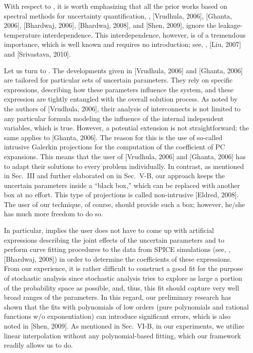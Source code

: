 \begin{authors}
With respect to , it is worth emphasizing that all the prior works based on spectral methods for uncertainty quantification, \ie, [Vrudhula, 2006], [Ghanta, 2006], [Bhardwaj, 2006], [Bhardwaj, 2008], and [Shen, 2009], ignore the leakage-temperature interdependence.
This interdependence, however, is of a tremendous importance, which is well known and requires no introduction; see, \eg, [Liu, 2007] and [Srivastava, 2010].

Let us turn to .
The developments given in [Vrudhula, 2006] and [Ghanta, 2006] are tailored for particular sets of uncertain parameters.
They rely on specific expressions, describing how these parameters influence the system, and these expression are tightly entangled with the overall solution process.
As noted by the authors of [Vrudhula, 2006], their analysis of interconnects is not limited to any particular formula modeling the influence of the internal independent variables, which is true.
However, a potential extension is not straightforward; the same applies to [Ghanta, 2006].
The reason for this is the use of so-called intrusive Galerkin projections for the computation of the coefficient of PC expansions.
This means that the user of [Vrudhula, 2006] and [Ghanta, 2006] has to adapt their solutions to every problem individually.
In contrast, as mentioned in Sec.~III and further elaborated on in Sec.~V-B, our approach keeps the uncertain parameters inside a ``black box,'' which can be replaced with another box at no effort.
This type of projections is called non-intrusive [Eldred, 2008].
The user of our technique, of course, should provide such a box; however, he/she has much more freedom to do so.

In particular,  implies the user does not have to come up with artificial expressions describing the joint effects of the uncertain parameters and to perform curve fitting procedures to the data from SPICE simulations (see, \eg, [Bhardwaj, 2008]) in order to determine the coefficients of these expressions.
From our experience, it is rather difficult to construct a good fit for the purpose of stochastic analysis since stochastic analysis tries to explore as large a portion of the probability space as possible, and, thus, this fit should capture very well broad ranges of the parameters.
In this regard, our preliminary research has shown that the fits with polynomials of low orders (pure polynomials and rational functions w/o exponentiation) can introduce significant errors, which is also noted in [Shen, 2009].
As mentioned in Sec.~VI-B, in our experiments, we utilize linear interpolation without any polynomial-based fitting, which our framework readily allows us to do.


\end{authors}
